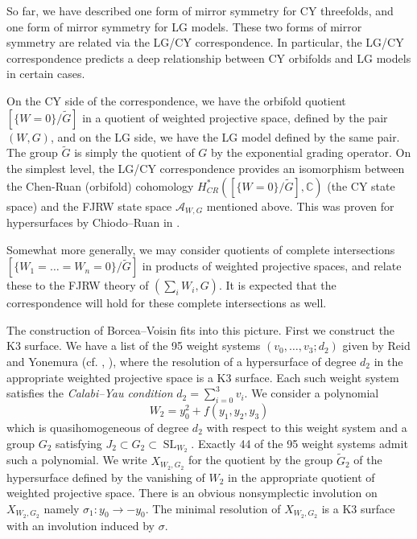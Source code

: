 \documentclass[10pt, letterpaper]{amsart}
\theoremstyle{remark}
\newcommand{\CC}{\mathbb C}
\newcommand{\sA}{\mathscr{A}}
\DeclareMathOperator{\SL}{SL}
\begin{document}
So far, we have described one form of mirror symmetry for CY threefolds, and one form of mirror symmetry for LG models. These two forms of mirror symmetry are related via the LG/CY correspondence. In particular, the LG/CY correspondence predicts a deep relationship between CY orbifolds and LG models in certain cases. %

On the CY side of the correspondence, we have the orbifold quotient $[\{W = 0\}/\widetilde{G}]$ in a quotient of weighted projective space, defined by the pair $(W,G)$, and on the LG side, we have the LG model defined by the same pair. The group $\widetilde{G}$ is simply the quotient of $G$ by the exponential grading operator. On the simplest level, the LG/CY correspondence provides an isomorphism between the Chen-Ruan (orbifold) cohomology $H^*_{CR}([\{W = 0\}/\widetilde{G}], \CC)$ (the CY state space) and the FJRW state space $\sA_{W,G}$ mentioned above. This was proven for hypersurfaces by Chiodo--Ruan in \cite{ChR}. 

Somewhat more generally, we may consider quotients of complete intersections $[\{W_1 = \ldots = W_n = 0\}/\widetilde G]$ in products of weighted projective spaces, and relate these to the FJRW theory of $(\sum_i W_i, G)$. It is expected that the correspondence will hold for these complete intersections as well. 

The construction of Borcea--Voisin fits into this picture. First we construct the K3 surface. We have a list of the 95 weight systems $(v_0,\dots,v_3;d_2)$ given by Reid and Yonemura (cf. \cite{Re}, \cite{Yo}), where the resolution of a hypersurface of degree $d_2$ in the appropriate weighted projective space is a K3 surface. Each such weight system satisfies the \emph{Calabi--Yau condition} $d_2=\sum_{i=0}^3 v_i$. We consider a polynomial 
\begin{equation}\label{e:Wform}
W_2=y_0^2+f(y_1,y_2,y_3) 
\end{equation}
which is quasihomogeneous of degree $d_2$ with respect to this weight system and a group $G_2$ satisfying $J_2\subset G_2\subset \SL_{W_2}$. Exactly 44 of the 95 weight systems admit such a polynomial. We write $X_{W_2,G_2}$ for the quotient by the group $\widetilde{G}_2$ of the hypersurface defined by the vanishing of $W_2$ in the appropriate quotient of weighted projective space. There is an obvious nonsymplectic involution on $X_{W_2,G_2}$ namely $\sigma_1:y_0\to -y_0$. The minimal resolution of $X_{W_2,G_2}$ is a K3 surface with an involution induced by $\sigma$. 
\end{document}
